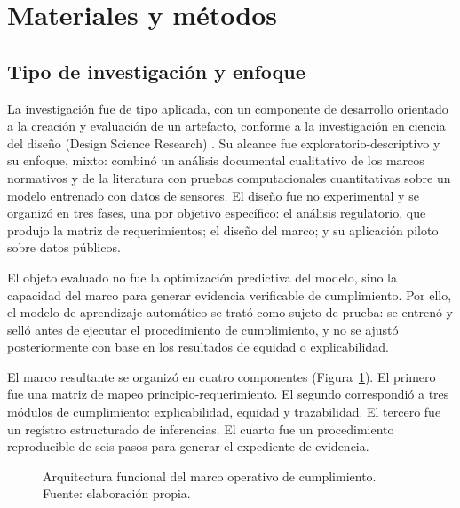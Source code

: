 
\section{Materiales y métodos}

\subsection{Tipo de investigación y enfoque}

La investigación fue de tipo aplicada, con un componente de desarrollo
orientado a la creación y evaluación de un artefacto, conforme a la
investigación en ciencia del diseño (Design Science Research)
\cite{hevner2004dsr}. Su alcance fue exploratorio-descriptivo y su enfoque,
mixto: combinó un análisis documental cualitativo de los marcos normativos y de
la literatura con pruebas computacionales cuantitativas sobre un modelo
entrenado con datos de sensores. El diseño fue no experimental y se organizó en
tres fases, una por objetivo específico: el análisis regulatorio, que produjo la
matriz de requerimientos; el diseño del marco; y su aplicación piloto sobre
datos públicos.

El objeto
evaluado no fue la optimización predictiva del modelo, sino la capacidad del
marco para generar evidencia verificable de cumplimiento. Por ello, el modelo de
aprendizaje automático se trató como sujeto de prueba: se entrenó y selló antes
de ejecutar el procedimiento de cumplimiento, y no se ajustó posteriormente con
base en los resultados de equidad o explicabilidad.

El marco resultante se organizó en cuatro componentes
(Figura~\ref{fig:arquitectura}). El primero fue una matriz de
mapeo principio-requerimiento. El segundo correspondió a tres módulos de
cumplimiento: explicabilidad, equidad y trazabilidad. El tercero fue un registro
estructurado de inferencias. El cuarto fue un procedimiento reproducible de seis
pasos para generar el expediente de evidencia.

\begin{figure}[htbp]
  \centering
  
  \caption{Arquitectura funcional del marco operativo de cumplimiento. Fuente: elaboración propia.}
  \label{fig:arquitectura}
\end{figure}

